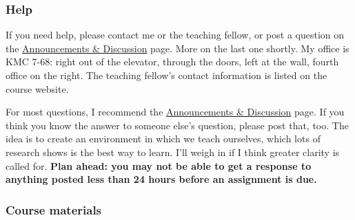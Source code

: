 \documentclass[12pt]{article}
\begin{document}
\subsubsection*{Help}

If you need help, please contact me or the teaching fellow, or post a question
on the
\href{https://sites.google.com/site/nyusternglobal/home/announcements}{Announcements \& Discussion}
page.
More on the last one shortly.
My office is KMC 7-68:
right out of the elevator, through the doors, left at the wall, fourth office on the right.
The teaching fellow's contact information is listed
on the course website.

For most questions, I recommend the
\href{https://sites.google.com/site/nyusternglobal/home/announcements}{Announcements \& Discussion}
page.
If you think you know the answer to someone else's question, please post that, too.
The idea is to create an environment in which we teach ourselves,
which lots of research shows is the best way to learn.
I'll weigh in if I think greater clarity is called for.
{\bf Plan ahead:  you may not be able to get a response to anything posted
less than 24 hours before an assignment is due.}



\subsubsection*{Course materials}
\end{document}
